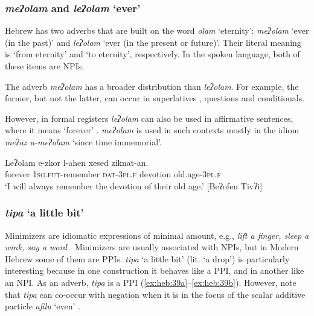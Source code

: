 \documentclass[output=paper,colorlinks,citecolor=brown]{langscibook}
\begin{document}
\subsubsection{\textit{meʔolam} and \textit{leʔolam} ‘ever’} \label{sec:heb:4.2.1}


Hebrew has two adverbs that are built on the word \textit{olam} ‘eternity’: \textit{meʔolam} ‘ever (in the past)’ and \textit{leʔolam} ‘ever (in the present or future)’. Their literal meaning is ‘from eternity’ and ‘to eternity’, respectively. In the spoken language, both of these items are NPIs.

The adverb \textit{meʔolam} has a broader distribution than \textit{leʔolam}. For example, the former, but not the latter, can occur in superlatives , questions and conditionals.

\ea\label{ex:heb:37}
    \z 
\z 

However, in formal registers \textit{leʔolam} can also be used in affirmative sentences, where it means ‘forever’ . \textit{meʔolam} is used in such contexts mostly in the idiom \textit{meʔaz u-meʔolam} ‘since time immemorial’.

\ea\label{ex:heb:38}
    \gll Leʔolam e-zkor l-ahen xesed ziknat-an.\\
         forever \textsc{1sg.fut}{}-remember \textsc{dat-3pl.f} devotion old.age-\textsc{3pl.f}\\
    \glt ‘I will always remember the devotion of their old age.’ [Beʔofen Tivʔi]
\z 

\subsubsection{\textit{tipa} ‘a little bit’} \label{sec:heb:4.2.2}

Minimizers are idiomatic expressions of minimal amount, e.g., \textit{lift a finger, sleep a wink, say a word} \citep[1662]{Giannakidou2011}. Minimizers are usually associated with NPIs, but in Modern Hebrew some of them are PPIs. \textit{tipa} ‘a little bit’ (lit. ‘a drop’) is particularly interesting because in one construction it behaves like a PPI, and in another like an NPI. As an adverb, \textit{tipa} is a PPI (\ref{ex:heb:39a}--\ref{ex:heb:39b}). However, note that \textit{tipa} can co-occur with negation when it is in the focus of the scalar additive particle \textit{afilu} ‘even’ .
\end{document}
